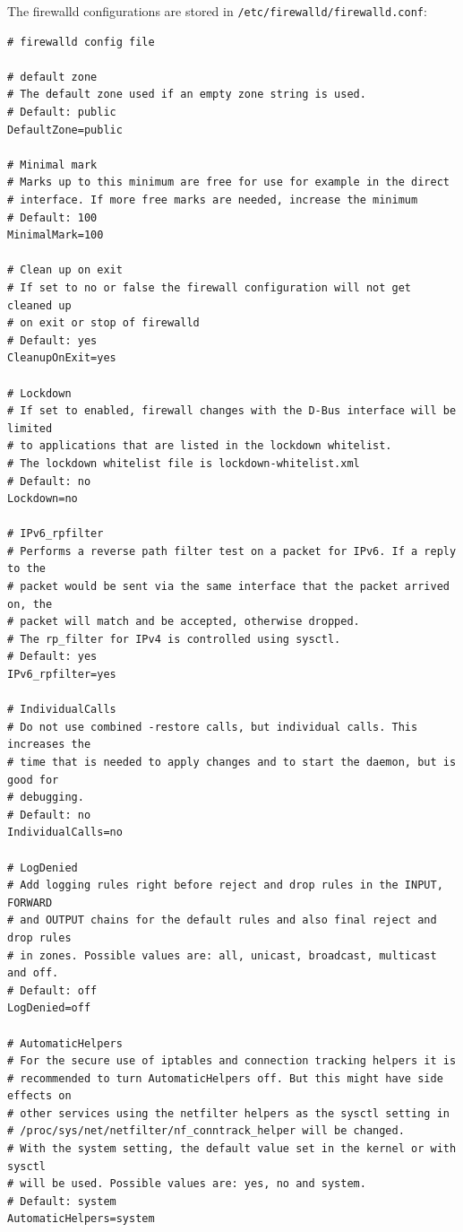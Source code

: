 \noindent
The firewalld configurations are stored in \verb|/etc/firewalld/firewalld.conf|:

\vspace{-15pt}
\begin{verbatim}
# firewalld config file

# default zone
# The default zone used if an empty zone string is used.
# Default: public
DefaultZone=public

# Minimal mark
# Marks up to this minimum are free for use for example in the direct 
# interface. If more free marks are needed, increase the minimum
# Default: 100
MinimalMark=100

# Clean up on exit
# If set to no or false the firewall configuration will not get cleaned up
# on exit or stop of firewalld
# Default: yes
CleanupOnExit=yes

# Lockdown
# If set to enabled, firewall changes with the D-Bus interface will be limited
# to applications that are listed in the lockdown whitelist.
# The lockdown whitelist file is lockdown-whitelist.xml
# Default: no
Lockdown=no

# IPv6_rpfilter
# Performs a reverse path filter test on a packet for IPv6. If a reply to the
# packet would be sent via the same interface that the packet arrived on, the 
# packet will match and be accepted, otherwise dropped.
# The rp_filter for IPv4 is controlled using sysctl.
# Default: yes
IPv6_rpfilter=yes

# IndividualCalls
# Do not use combined -restore calls, but individual calls. This increases the
# time that is needed to apply changes and to start the daemon, but is good for
# debugging.
# Default: no
IndividualCalls=no

# LogDenied
# Add logging rules right before reject and drop rules in the INPUT, FORWARD
# and OUTPUT chains for the default rules and also final reject and drop rules
# in zones. Possible values are: all, unicast, broadcast, multicast and off.
# Default: off
LogDenied=off

# AutomaticHelpers
# For the secure use of iptables and connection tracking helpers it is
# recommended to turn AutomaticHelpers off. But this might have side effects on
# other services using the netfilter helpers as the sysctl setting in
# /proc/sys/net/netfilter/nf_conntrack_helper will be changed.
# With the system setting, the default value set in the kernel or with sysctl
# will be used. Possible values are: yes, no and system.
# Default: system
AutomaticHelpers=system
\end{verbatim}
\vspace{-10pt}	

